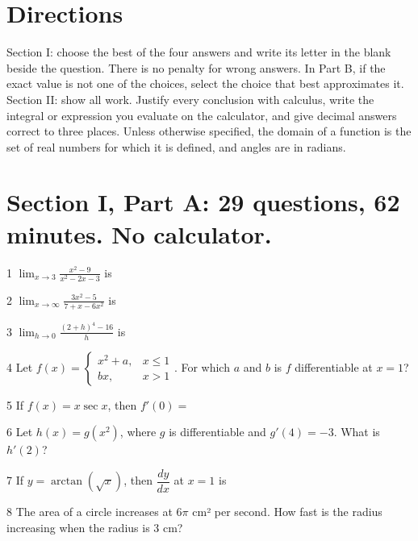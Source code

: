 \documentclass{apcalc}
\begin{document}
\section*{Directions}
Section I: choose the best of the four answers and write its letter in the blank beside the question. There is no penalty for wrong answers. In Part B, if the exact value is not one of the choices, select the choice that best approximates it. Section II: show all work. Justify every conclusion with calculus, write the integral or expression you evaluate on the calculator, and give decimal answers correct to three places. Unless otherwise specified, the domain of a function is the set of real numbers for which it is defined, and angles are in radians.
\clearpage\section*{Section I, Part A: 29 questions, 62 minutes. No calculator.}
\begin{q}{1}
$\displaystyle\lim_{x\to3}\frac{x^2-9}{x^2-2x-3}$ is
\end{q}
\begin{q}{2}
$\displaystyle\lim_{x\to\infty}\frac{3x^2-5}{7+x-6x^2}$ is
\end{q}
\begin{q}{3}
$\displaystyle\lim_{h\to0}\frac{(2+h)^4-16}{h}$ is
\end{q}
\begin{q}{4}
Let $f(x)=\begin{cases}x^2+a,&x\le1\\ bx,&x>1\end{cases}$. For which $a$ and $b$ is $f$ differentiable at $x=1$?
\end{q}
\begin{q}{5}
If $f(x)=x\sec x$, then $f'(0)=$
\end{q}
\begin{q}{6}
Let $h(x)=g(x^2)$, where $g$ is differentiable and $g'(4)=-3$. What is $h'(2)$?
\end{q}
\begin{q}{7}
If $y=\arctan(\sqrt x)$, then $\dfrac{dy}{dx}$ at $x=1$ is
\end{q}
\begin{q}{8}
The area of a circle increases at $6\pi$ cm² per second. How fast is the radius increasing when the radius is 3 cm?
\end{q}
\end{document}
